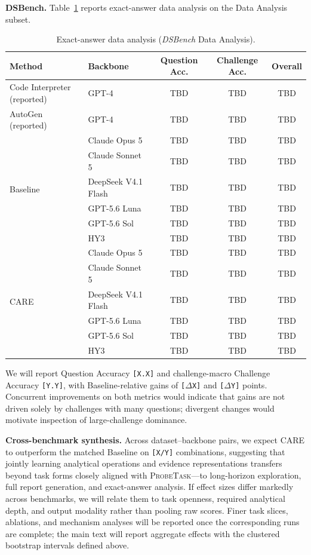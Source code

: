 \documentclass{article}
\newcommand{\method}{\textsc{CARE}}
\newcommand{\probe}{\textsc{ProbeTask}}
\begin{document}
\noindent\textbf{DSBench.} Table~\ref{tab:dsbench-matrix} reports exact-answer data analysis on the Data Analysis subset.

\begin{table}[t]
  \caption{Exact-answer data analysis (\textit{DSBench} Data Analysis).}
  \label{tab:dsbench-matrix}
  \centering
  \scriptsize
  \begin{tabular}{llccc}
    \toprule
    Method & Backbone & Question Acc. & Challenge Acc. & Overall \\
    \midrule
    Code Interpreter (reported) & GPT-4 & TBD & TBD & TBD \\
    AutoGen (reported) & GPT-4 & TBD & TBD & TBD \\
    \midrule
    \multirow{6}{*}{Baseline}
      & Claude Opus 5 & TBD & TBD & TBD \\
      & Claude Sonnet 5 & TBD & TBD & TBD \\
      & DeepSeek V4.1 Flash & TBD & TBD & TBD \\
      & GPT-5.6 Luna & TBD & TBD & TBD \\
      & GPT-5.6 Sol & TBD & TBD & TBD \\
      & HY3 & TBD & TBD & TBD \\
    \midrule
    \multirow{6}{*}{\method{}}
      & Claude Opus 5 & TBD & TBD & TBD \\
      & Claude Sonnet 5 & TBD & TBD & TBD \\
      & DeepSeek V4.1 Flash & TBD & TBD & TBD \\
      & GPT-5.6 Luna & TBD & TBD & TBD \\
      & GPT-5.6 Sol & TBD & TBD & TBD \\
      & HY3 & TBD & TBD & TBD \\
    \bottomrule
  \end{tabular}
\end{table}

We will report Question Accuracy \texttt{[X.X]} and challenge-macro Challenge Accuracy \texttt{[Y.Y]}, with Baseline-relative gains of \texttt{[$\Delta$X]} and \texttt{[$\Delta$Y]} points.
Concurrent improvements on both metrics would indicate that gains are not driven solely by challenges with many questions; divergent changes would motivate inspection of large-challenge dominance.

\noindent\textbf{Cross-benchmark synthesis.}
Across dataset--backbone pairs, we expect \method{} to outperform the matched Baseline on \texttt{[X/Y]} combinations, suggesting that jointly learning analytical operations and evidence representations transfers beyond task forms closely aligned with \probe{}---to long-horizon exploration, full report generation, and exact-answer analysis.
If effect sizes differ markedly across benchmarks, we will relate them to task openness, required analytical depth, and output modality rather than pooling raw scores.
Finer task slices, ablations, and mechanism analyses will be reported once the corresponding runs are complete; the main text will report aggregate effects with the clustered bootstrap intervals defined above.
\end{document}

